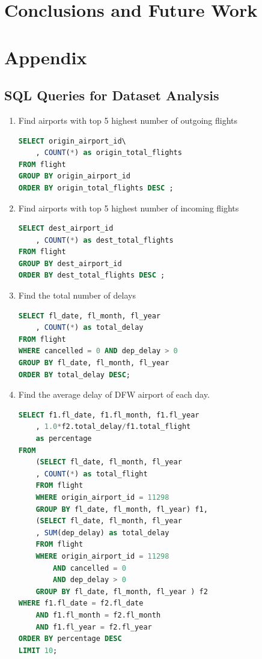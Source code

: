 \documentclass[11pt,a4paper]{article}
\begin{document}
\section{Conclusions and Future Work}
\label{sec:conc}




\section*{Appendix}
\subsection*{SQL Queries for Dataset Analysis}
\begin{enumerate}
\item Find airports with top 5 highest number of outgoing flights
\begin{lstlisting}[frame=single, language=SQL]
SELECT origin_airport_id\
	, COUNT(*) as origin_total_flights
FROM flight
GROUP BY origin_airport_id
ORDER BY origin_total_flights DESC ;
\end{lstlisting}
\item Find airports with top 5 highest number of incoming flights
\begin{lstlisting}[frame=single, language=SQL]
SELECT dest_airport_id
	, COUNT(*) as dest_total_flights
FROM flight
GROUP BY dest_airport_id
ORDER BY dest_total_flights DESC ;
\end{lstlisting}
\item Find the total number of delays

\begin{lstlisting}[frame=single, language=SQL]
SELECT fl_date, fl_month, fl_year
	, COUNT(*) as total_delay
FROM flight
WHERE cancelled = 0 AND dep_delay > 0
GROUP BY fl_date, fl_month, fl_year
ORDER BY total_delay DESC;
\end{lstlisting}
\item Find the average delay of DFW airport of each day.
\begin{lstlisting}[frame=single, language=SQL]
SELECT f1.fl_date, f1.fl_month, f1.fl_year
	, 1.0*f2.total_delay/f1.total_flight 
	as percentage
FROM
	(SELECT fl_date, fl_month, fl_year
	, COUNT(*) as total_flight
	FROM flight
	WHERE origin_airport_id = 11298
	GROUP BY fl_date, fl_month, fl_year) f1,
	(SELECT fl_date, fl_month, fl_year
	, SUM(dep_delay) as total_delay
	FROM flight
	WHERE origin_airport_id = 11298
		AND cancelled = 0
		AND dep_delay > 0
	GROUP BY fl_date, fl_month, fl_year ) f2
WHERE f1.fl_date = f2.fl_date
	AND f1.fl_month = f2.fl_month
	AND f1.fl_year = f2.fl_year
ORDER BY percentage DESC
LIMIT 10;
\end{lstlisting}
\end{enumerate}
\end{document}
